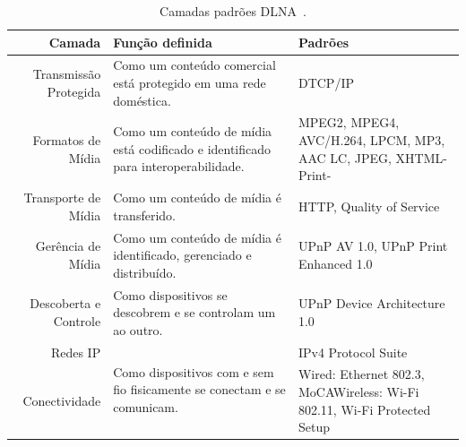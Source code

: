 \begin{table}
	\begin{center}
		\begin{tabular}{rll}
		\hline
		\textbf{Camada} & \textbf{Função definida} & \textbf{Padrões}				\\
		\hline
		Transmissão Protegida & Como um conteúdo comercial está protegido em uma rede doméstica. & DTCP/IP \\
		\hline
		Formatos de Mídia & Como um conteúdo de mídia está codificado e identificado para interoperabilidade. & MPEG2, MPEG4, AVC/H.264, LPCM, MP3, AAC LC, JPEG, XHTML-Print- \\
		\hline
		Transporte de Mídia & Como um conteúdo de mídia é transferido. & HTTP, Quality of Service \\
		\hline
		Gerência de Mídia & Como um conteúdo de mídia é identificado, gerenciado e distribuído. & UPnP AV 1.0, UPnP Print Enhanced 1.0 \\
		\hline
		Descoberta e Controle & Como dispositivos se descobrem e se controlam um ao outro. & UPnP Device Architecture 1.0 \\
		\hline
		Redes IP & \multirow{2}{*}{Como dispositivos com e sem fio fisicamente se conectam e se comunicam.} & IPv4 Protocol Suite \\
		Conectividade & & Wired: Ethernet 802.3, MoCAWireless: Wi-Fi 802.11, Wi-Fi Protected Setup \\
		\hline
		\end{tabular}
	\end{center}
	\caption{Camadas padrões DLNA~\cite{dlnahdvideostreaming}.}
	\label{tab:camadaspadroes_dlna}
\end{table}
